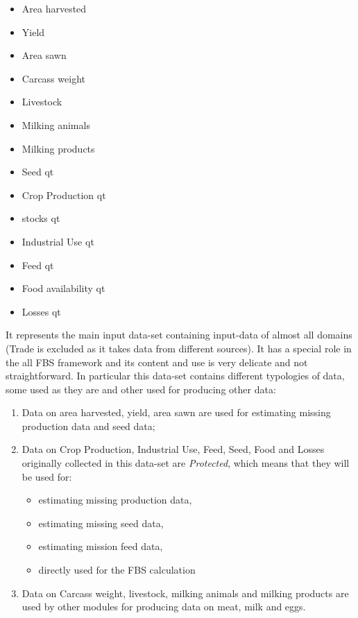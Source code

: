 \documentclass[]{article}
\providecommand{\tightlist}{%
  \setlength{\itemsep}{0pt}\setlength{\parskip}{0pt}}
\begin{document}
\begin{itemize}
\tightlist
\item
  Area harvested
\item
  Yield
\item
  Area sawn
\item
  Carcass weight
\item
  Livestock
\item
  Milking animals
\item
  Milking products
\item
  Seed qt
\item
  Crop Production qt
\item
  stocks qt
\item
  Industrial Use qt
\item
  Feed qt
\item
  Food availability qt
\item
  Losses qt
\end{itemize}

It represents the main input data-set containing input-data of almost
all domains (Trade is excluded as it takes data from different sources).
It has a special role in the all FBS framework and its content and use
is very delicate and not straightforward. In particular this data-set
contains different typologies of data, some used as they are and other
used for producing other data:

\begin{enumerate}
\def\labelenumi{\arabic{enumi}.}
\tightlist
\item
  Data on area harvested, yield, area sawn are used for estimating
  missing production data and seed data;
\item
  Data on Crop Production, Industrial Use, Feed, Seed, Food and Losses
  originally collected in this data-set are \emph{Protected}, which
  means that they will be used for:

  \begin{itemize}
  \tightlist
  \item
    estimating missing production data,
  \item
    estimating missing seed data,
  \item
    estimating mission feed data,
  \item
    directly used for the FBS calculation
  \end{itemize}
\item
  Data on Carcass weight, livestock, milking animals and milking
  products are used by other modules for producing data on meat, milk
  and eggs.
\end{enumerate}
\end{document}
